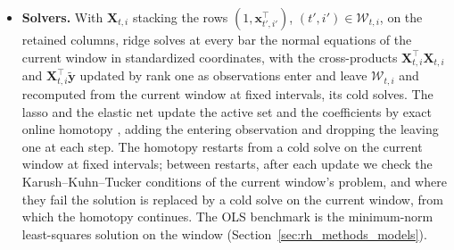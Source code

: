 \begin{itemize}
  other two screens at every bar, and the exact duplicates at each of its cold solves (below). The lasso and the
  elastic net apply every screen at each cold solve; between cold solves, a retained column that fails the evidence or
  the availability screen, or, for the lasso, becomes constant or an exact duplicate, is left out at once and the
  solver restarts cold. The tree ensembles use every column.
\item \textbf{Solvers.} With $\bm X_{t,i}$ stacking the rows $(1, \bm x_{t',i'}^\top)$, $(t',i') \in \mathcal W_{t,i}$,
  on the retained columns, ridge solves at every bar the normal equations of the current window in standardized
  coordinates, with the cross-products $\bm X_{t,i}^\top \bm X_{t,i}$ and $\bm X_{t,i}^\top \tilde{\bm y}$ updated by
  rank one as observations enter and leave $\mathcal W_{t,i}$ and recomputed from the current window at fixed
  intervals, its cold solves. The lasso and the elastic net update the active set and
  the coefficients by exact online homotopy \citep{Garrigues2008}, adding the entering observation and dropping the
  leaving one at each step. The homotopy restarts from a cold solve on the current window at fixed intervals; between
  restarts, after each update we check the Karush--Kuhn--Tucker conditions of the current window's problem, and where
  they fail the solution is replaced by a cold solve on the current window, from which the homotopy continues. The OLS
  benchmark is the minimum-norm least-squares solution on the window (Section~\ref{sec:rh_methods_models}).
\end{itemize}


